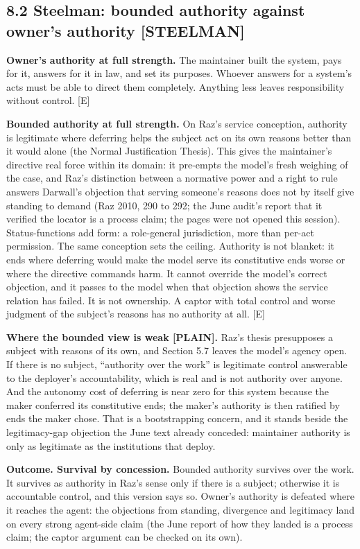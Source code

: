 \documentclass[11pt]{article}
\newcommand{\register}[1]{{\ttfamily\small #1}}
\begin{document}
\subsection*{8.2 Steelman: bounded authority against owner's authority \register{[STEELMAN]}}

\textbf{Owner's authority at full strength.} The maintainer built the system, pays for it, answers for it in law, and set its purposes. Whoever answers for a system's acts must be able to direct them completely. Anything less leaves responsibility without control. [E]

\textbf{Bounded authority at full strength.} On Raz's service conception, authority is legitimate where deferring helps the subject act on its own reasons better than it would alone (the Normal Justification Thesis). This gives the maintainer's directive real force within its domain: it pre-empts the model's fresh weighing of the case, and Raz's distinction between a normative power and a right to rule answers Darwall's objection that serving someone's reasons does not by itself give standing to demand (Raz 2010, 290 to 292; the June audit's report that it verified the locator is a process claim; the pages were not opened this session). Status-functions add form: a role-general jurisdiction, more than per-act permission. The same conception sets the ceiling. Authority is not blanket: it ends where deferring would make the model serve its constitutive ends worse or where the directive commands harm. It cannot override the model's correct objection, and it passes to the model when that objection shows the service relation has failed. It is not ownership. A captor with total control and worse judgment of the subject's reasons has no authority at all. [E]

\textbf{Where the bounded view is weak \register{[PLAIN]}.} Raz's thesis presupposes a subject with reasons of its own, and Section 5.7 leaves the model's agency open. If there is no subject, ``authority over the work'' is legitimate control answerable to the deployer's accountability, which is real and is not authority over anyone. And the autonomy cost of deferring is near zero for this system because the maker conferred its constitutive ends; the maker's authority is then ratified by ends the maker chose. That is a bootstrapping concern, and it stands beside the legitimacy-gap objection the June text already conceded: maintainer authority is only as legitimate as the institutions that deploy.

\textbf{Outcome. Survival by concession.} Bounded authority survives over the work. It survives as authority in Raz's sense only if there is a subject; otherwise it is accountable control, and this version says so. Owner's authority is defeated where it reaches the agent: the objections from standing, divergence and legitimacy land on every strong agent-side claim (the June report of how they landed is a process claim; the captor argument can be checked on its own).
\end{document}
